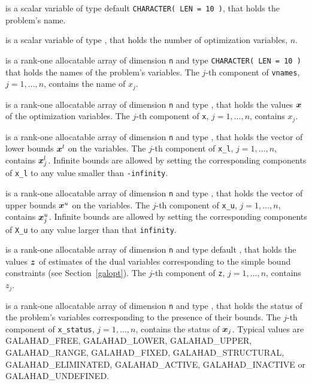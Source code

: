 \documentclass{galahad}
\newcommand{\sym}{\sf\small}
\begin{document}
\begin{description}
 is a scalar variable of type default {\tt CHARACTER( LEN = 10 )},
that holds the problem's name.

 is a scalar variable of type \integer, 
 that holds the number of optimization variables, $n$.  

 is a rank-one allocatable array of dimension {\tt n} and type 
{\tt CHARACTER( LEN = 10 )} that holds the names of the problem's
variables. The $j$-th component of {\tt vnames}, $j = 1,  \ldots , n$, 
contains the name of $x_{j}$.  
              
 is a rank-one allocatable array of dimension {\tt n} and type 
\realdp, 
that holds the values ${\bm{x}}$ of the optimization variables.
The $j$-th component of {\tt x}, $j = 1,  \ldots , n$, contains $x_{j}$.  

 is a rank-one allocatable array of dimension {\tt n} and type 
\realdp, that holds
the vector of lower bounds ${\bm{x}}^{l}$ on the variables.
The $j$-th component of {\tt x\_l}, $j = 1, \ldots , n$, 
contains ${\bm{x}}_{j}^{l}$.
Infinite bounds are allowed by setting the corresponding 
components of {\tt x\_l} to any value smaller than {\tt -infinity}.

 is a rank-one allocatable array of dimension {\tt n} and type 
\realdp, that holds
the vector of upper bounds ${\bm{x}}^{u}$ on the variables.
The $j$-th component of {\tt x\_u}, $j = 1, \ldots , n$, 
contains ${\bm{x}}_{j}^{u}$.
Infinite bounds are allowed by setting the corresponding 
components of {\tt X\_u} to any value larger than that {\tt infinity}. 

 is a rank-one allocatable array of dimension {\tt n} and type default 
\realdp, that holds
the values ${\bm{z}}$ of estimates  of the dual variables 
corresponding to the simple bound constraints (see Section~\ref{galopt}).
The $j$-th component of {\tt z}, $j = 1,  \ldots ,  n$, contains $z_{j}$.  

 is  a rank-one allocatable array of dimension {\tt n} and type 
\integer, that holds the status of the problem's variables
corresponding to the presence of their bounds. The $j$-th component of 
{\tt x\_status}, $j = 1,  \ldots ,  n$, contains the status of ${\bm{x}}_j$.
Typical values are
{\sym GALAHAD\_FREE},  {\sym GALAHAD\_LOWER}, {\sym GALAHAD\_UPPER},
{\sym GALAHAD\_RANGE}, {\sym GALAHAD\_FIXED}, {\sym GALAHAD\_STRUCTURAL},
{\sym GALAHAD\_ELIMINATED}, {\sym GALAHAD\_ACTIVE}, 
{\sym GALAHAD\_INACTIVE} or {\sym GALAHAD\_UNDEFINED}.
        

\end{description}
\end{document}
